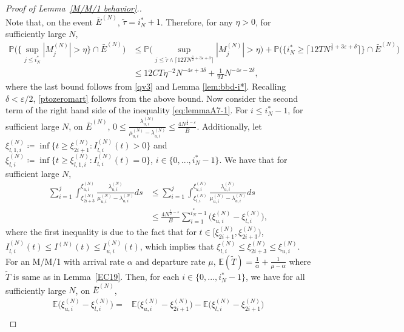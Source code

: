 \documentclass[11pt, reqno]{article}
\numberwithin{equation}{section}
\numberwithin{theorem}{section}
\begin{document}
\begin{appendix}
\begin{proof}[Proof of Lemma~\ref{M/M/1 behavior}.]
\begin{equation}
\end{equation}
Note that, on the event $\bar{E}^{(N)}$, $\tilde \tau = i^*_N + 1$. Therefore, for any $\eta>0$, for sufficiently large $N$,
\begin{align*}
\mathbb{P}\bigg(\bigg\lbrace \sup_{j \le i^*_N} \left|M^{(N)}_j\right|  > \eta \bigg\rbrace \cap \bar{E}^{(N)}\bigg)  &\le \mathbb{P}\bigg(\sup_{j \le \tilde \tau \wedge \lceil 12TN^{\frac{1}{2}+3\varepsilon+\delta}\rceil} \left|M^{(N)}_{j}\right|  > \eta\bigg) + \mathbb{P}\Big(\big\{i^*_N\geq \lceil 12TN^{\frac{1}{2}+3\varepsilon+\delta}\rceil\big\}\cap \bar{E}^{(N)}\Big)\\
&\le 12CT\eta^{-2} N^{ - 4\varepsilon + 3\delta} + \frac{1}{9T}N^{-4\varepsilon-2\delta},
\end{align*}
where the last bound follows from \eqref{qv3} and Lemma \ref{lem:bbd-i*}. Recalling $\delta < \varepsilon/2$, \eqref{ptozeromart} follows from the above bound. 
Now consider the second term of the right hand side of the inequality \eqref{eq:lemmaA7-1}. 
For $i \le i^*_N-1$, for sufficient large $N$, on $\bar{E}^{(N)}$,
$
    0\leq \frac{\lambda^{(N)}_{u,i}}{\mu^{(N)}_{u,i}-\lambda^{(N)}_{u,i}}\leq \frac{4N^{\frac{1}{2}-\varepsilon}}{B}.
$
Additionally, let $\xi^{(N)}_{l,1,i}\coloneqq\inf \{t\geq \xi^{(N)}_{2i+1}:I^{(N)}_{l,i}(t)>0\}$ and $\xi^{(N)}_{l,i}\coloneqq\inf \{t\geq \xi^{(N)}_{l,1,i}:I^{(N)}_{l,i}(t)=0\}$, $i\in\{0,...,i^*_N-1\}$. We have that for sufficient large $N$,
\begin{align}\label{eq:loacl-A39}
    \sum_{i=1}^{j}\int_{\xi^{(N)}_{2i+3}}^{\xi^{(N)}_{u,i}}\frac{\lambda^{(N)}_{u,i}}{\mu^{(N)}_{u,i}-\lambda^{(N)}_{u,i}}ds&\leq 
    \sum_{i=1}^{j}\int_{\xi^{(N)}_{l,i}}^{\xi^{(N)}_{u,i}}\frac{\lambda^{(N)}_{u,i}}{\mu^{(N)}_{u,i}-\lambda^{(N)}_{u,i}}ds\nonumber\\
    &\leq \frac{4N^{\frac{1}{2}-\varepsilon}}{B}\sum_{i=1}^{i^*_N - 1}\Big(\xi^{(N)}_{u,i}-\xi^{(N)}_{l,i}\Big),
\end{align}
where the first inequality is due to the fact that for $t\in[\xi^{(N)}_{2i+1},\xi^{(N)}_{2i+3})$, $I^{(N)}_{l,i}(t)\leq I^{(N)}(t) \leq I^{(N)}_{u,i}(t)$, which implies that $\xi^{(N)}_{l,i}\leq \xi^{(N)}_{2i+3}\leq \xi^{(N)}_{u,i}$.
For an M/M/1 with arrival rate $\alpha$ and departure rate $\mu$, $\mathbb{E}(\tilde{T})=\frac{1}{\alpha}+\frac{1}{\mu-\alpha}$ where $\tilde{T}$ is same as in Lemma~\ref{EC19}. 
Then, for each $i\in\{0,...,i^*_N-1\}$, we have for all sufficiently large $N$, on $\bar{E}^{(N)}$,
\begin{align*}
   \mathbb{E}\Big(\xi^{(N)}_{u,i}-\xi^{(N)}_{l,i}\Big)= &\mathbb{E}\Big(\xi^{(N)}_{u,i}-\xi^{(N)}_{2i+1}\Big)-\mathbb{E}\Big(\xi^{(N)}_{l,i}-\xi^{(N)}_{2i+1}\Big)\\

\end{align*}
\end{proof}
\end{appendix}
\end{document}
